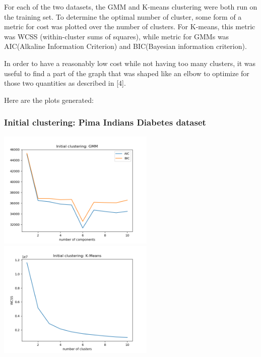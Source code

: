 \documentclass[11pt]{article}
\begin{document}


            For each of the two datasets,
            the GMM and K-means clustering were both run on the training set. To determine the optimal number
            of cluster, some form of a metric for cost was plotted over the number of clusters. For K-means, this metric
            was WCSS (within-cluster sums of squares), while metric for GMMs was AIC(Alkaline
            Information Criterion) and BIC(Bayesian information criterion).
            
            In order to have a reasonably low cost while not having too many clusters,
            it was useful to find a part of the graph that was shaped
            like an elbow to optimize for those two quantities as described in [4].

            Here are the plots generated:

            \subsubsection{Initial clustering: Pima Indians Diabetes dataset}

            \includegraphics[width=7.5cm]{../pima/clustering1/gmm_init.png}
            \includegraphics[width=7.5cm]{../pima/clustering1/km_init.png}
\end{document}
